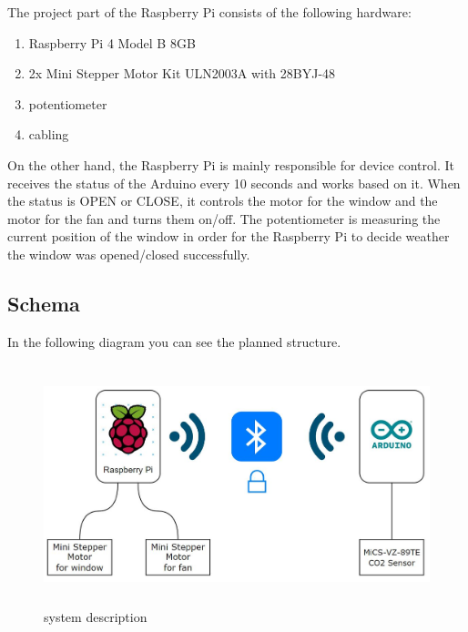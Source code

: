 The project part of the Raspberry Pi consists of the following hardware:

\begin{enumerate}[label*=\arabic*.]
    \item \label{io.1} Raspberry Pi 4 Model B 8GB
    \item \label{io.2} 2x Mini Stepper Motor Kit ULN2003A with 28BYJ-48
    \item \label{io.3} potentiometer
    \item \label{io.4} cabling
\end{enumerate}

On the other hand, the Raspberry Pi is mainly responsible for device control. It receives the status of the Arduino every 10 seconds and works based on it. When the status is OPEN or CLOSE, it controls the motor for the window and the motor for the fan and turns them on/off. The potentiometer is measuring the current position of the window in order for the Raspberry Pi to decide weather the window was opened/closed successfully.

\newpage

\subsection{Schema}

In the following diagram you can see the planned structure.

\begin{figure}[h]
	\includegraphics[height=70mm]{images/schema_technologien.jpg}
	\centering
	\caption{system description}
	\label{fig:system}
\end{figure}






